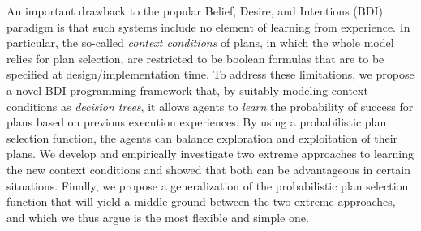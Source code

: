 An important drawback to the popular Belief, Desire, and Intentions (BDI)
paradigm is that such systems include no element of learning from experience.
In particular, the so-called \emph{context conditions} of plans, in which the
whole model relies for plan selection, are restricted to be boolean formulas that
are to be specified at design/implementation time.
To address these limitations, we propose a novel BDI programming framework that,
by suitably modeling context conditions as \emph{decision trees}, it allows
agents to \emph{learn} the probability of success for plans based on previous
execution experiences. By using a probabilistic plan selection function, the
agents can balance exploration and exploitation of their plans.
We develop and empirically investigate two extreme approaches to learning the new
context conditions and showed that both can be advantageous in certain
situations.
Finally, we propose a generalization of the probabilistic plan selection function
that will yield a middle-ground between the two extreme approaches, and which we
thus argue is the most flexible and simple one.

